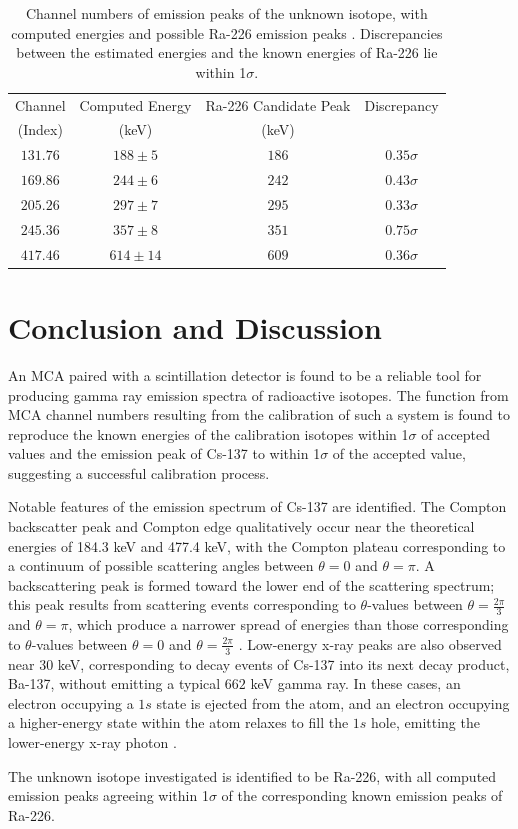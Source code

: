 \documentclass[11pt]{article}
\begin{document}
\begin{table}[h]
  \centering
  \begin{tabular}{cccc}
    \hline
    Channel & Computed Energy & Ra-226 Candidate Peak & Discrepancy \\
    (Index) & (keV) & (keV) & \\
    \hline
    $131.76$ & $188\pm 5$ & $186$ & $0.35\sigma$ \\
    $169.86$ & $244\pm 6$ & $242$ & $0.43\sigma$ \\
    $205.26$ & $297\pm 7$ & $295$ & $0.33\sigma$ \\
    $245.36$ & $357 \pm 8$ & $351$ & $0.75\sigma$ \\
    $417.46$ & $614 \pm 14$ & $609$ & $0.36\sigma$ \\
    \hline
  \end{tabular}
  \label{tab:unknown}
  \caption{Channel numbers of emission peaks of the unknown isotope,
    with computed energies
    and possible Ra-226 emission peaks \cite{ra226}. Discrepancies between the
    estimated energies and the known
  energies of Ra-226 lie within 1$\sigma$.}
\end{table}

\section{Conclusion and Discussion}

An MCA paired with a scintillation detector is found to be a reliable
tool for producing gamma ray emission spectra of radioactive
isotopes. The function from MCA channel numbers resulting from the calibration
of such a system is found to reproduce the known energies of the
calibration isotopes within 1$\sigma$ of accepted values and the
emission peak of Cs-137 to within 1$\sigma$ of the accepted value,
suggesting a successful calibration process.

\vspace{1em}

Notable features of the emission spectrum of Cs-137 are identified. The
Compton backscatter peak and Compton edge qualitatively occur near the
theoretical energies of 184.3 keV and 477.4 keV, with the Compton
plateau corresponding to a continuum of possible scattering angles
between $\theta = 0$ and
$\theta = \pi$. A backscattering peak is formed toward the
lower end of the scattering spectrum; this peak results from scattering
events corresponding to $\theta$-values between $\theta = \frac{2
\pi}{3}$ and $\theta = \pi$,
which produce a narrower spread of energies than those corresponding to
$\theta$-values between $\theta = 0$ and $\theta = \frac{2 \pi}{3}$
\cite{knoll}. Low-energy x-ray peaks are also observed near $30$ keV,
corresponding to decay events of Cs-137 into its next decay product, Ba-137,
without emitting a typical $662$ keV gamma ray. In these cases, an electron
occupying a $1s$ state is ejected from the atom,
and an electron occupying a higher-energy state within the atom relaxes to fill
the $1s$ hole, emitting the lower-energy x-ray photon \cite{ucsb, france, mel}.

\vspace{1em}

The unknown isotope investigated is identified to be Ra-226, with all computed
emission peaks agreeing within 1$\sigma$ of the corresponding known
emission peaks of Ra-226.



\end{document}
